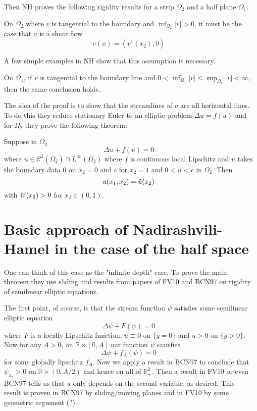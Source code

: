 Then NH proves the following rigidity results for a strip $\Omega_2$ and a half plane $\Omega_1$.

\begin{theorem}
    On $\overline{\Omega_2}$ where $v$ is tangential to the boundary and $\inf_{\Omega_2}|v| > 0$, it must be the case that $v$ is a shear flow
    \[v(x) = (v^1(x_2), 0)\]
\end{theorem}
A few simple examples in NH show that this assumption is necessary.

\begin{theorem}
    On $\Omega_1$, if $v$ is tangential to the boundary line and $0 < \inf_{\Omega_1}|v| \leq \sup_{\Omega_1}|v| < \infty$, then the same conclusion holds.
\end{theorem}
The idea of the proof is to show that the streamlines of $v$ are all horizontal lines. To do this they reduce stationary Euler to an elliptic problem $\Delta u = f(u)$ and for $\Omega_2$ they prove the following theorem:

\begin{theorem}
    Suppose in $\Omega_2$ 
    \[\Delta u + f(u) = 0\] where $u \in \mathcal{C}^2(\overline{\Omega_2}) \cap L^\infty(\Omega_2)$ where $f$ is continuous local Lipschitz and $u$ takes the boundary data $0$ on $x_2 = 0$ and $c$ for $x_2 = 1$ and $0 < u < c$ in $\Omega_2$. Then
    \[u(x_1, x_2) = \Tilde{u}(x_2)\] with $\Tilde{u}'(x_2) > 0$ for $x_2 \in (0, 1)$.
\end{theorem}

\section{Basic approach of Nadirashvili-Hamel in the case of the half space}

One can think of this case as the "infinite depth" case. To prove the main theorem they use sliding and results from papers of FV10 and BCN97 on rigidity of semilinear elliptic equations.

The first point, of course, is that the stream function $\psi$ satisfies some semilinear elliptic equation
\[\Delta \psi + F(\psi) = 0\]
where $F$ is a locally Lipschitz function, $u \equiv 0$ on $\{y = 0\}$ and $u > 0$ on $\{y > 0\}$. Now for any $A > 0$, on $\mathbb{R} \times [0, A]$ our function $\psi$ satisfies
\[\Delta \psi + f_A(\psi) = 0\]
for some globally lipschitz $f_A$. Now we apply a result in BCN97 to conclude that $\psi_{x_2} > 0$ on $\mathbb{R} \times (0, A/2)$ and hence on all of $\mathbb{R}^2_+$. Then a result in FV10 or even BCN97 tells us that $u$ only depends on the second variable, as desired. This result is proven in BCN97 by sliding/moving planes and in FV10 by some geometric argument (?).

